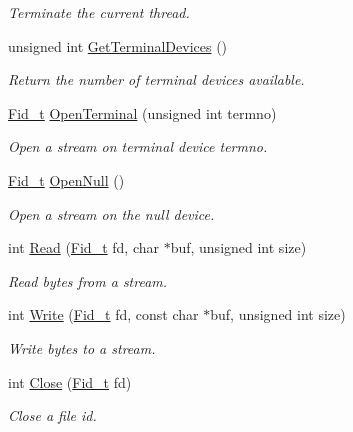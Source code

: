 \begin{DoxyCompactItemize}
\begin{DoxyCompactList}\small\item\em Terminate the current thread. \end{DoxyCompactList}\item 
unsigned int \hyperlink{group__syscalls_ga31576e1579c15b6b066038702e6557c7}{Get\+Terminal\+Devices} ()
\begin{DoxyCompactList}\small\item\em Return the number of terminal devices available. \end{DoxyCompactList}\item 
\hyperlink{group__syscalls_ga5097222c5f0da97d92d4712359abc38f}{Fid\+\_\+t} \hyperlink{group__syscalls_ga6ea2b586a8dfcfc1e7065e1664a0fb35}{Open\+Terminal} (unsigned int termno)
\begin{DoxyCompactList}\small\item\em Open a stream on terminal device \textquotesingle{}termno\textquotesingle{}. \end{DoxyCompactList}\item 
\hyperlink{group__syscalls_ga5097222c5f0da97d92d4712359abc38f}{Fid\+\_\+t} \hyperlink{group__syscalls_ga39805b4ae668b715fb43f0f1e6ce8c45}{Open\+Null} ()
\begin{DoxyCompactList}\small\item\em Open a stream on the null device. \end{DoxyCompactList}\item 
int \hyperlink{group__syscalls_ga3e9dc545a789eb45b2d356eabbac3ee3}{Read} (\hyperlink{group__syscalls_ga5097222c5f0da97d92d4712359abc38f}{Fid\+\_\+t} fd, char $\ast$buf, unsigned int size)
\begin{DoxyCompactList}\small\item\em Read bytes from a stream. \end{DoxyCompactList}\item 
int \hyperlink{group__syscalls_gaf046f003fde24f79fb395c250137856c}{Write} (\hyperlink{group__syscalls_ga5097222c5f0da97d92d4712359abc38f}{Fid\+\_\+t} fd, const char $\ast$buf, unsigned int size)
\begin{DoxyCompactList}\small\item\em Write bytes to a stream. \end{DoxyCompactList}\item 
int \hyperlink{group__syscalls_ga82187e2e98af053a2ab6cb516e9e7f5a}{Close} (\hyperlink{group__syscalls_ga5097222c5f0da97d92d4712359abc38f}{Fid\+\_\+t} fd)
\begin{DoxyCompactList}\small\item\em Close a file id. \end{DoxyCompactList}\item 

\end{DoxyCompactItemize}
